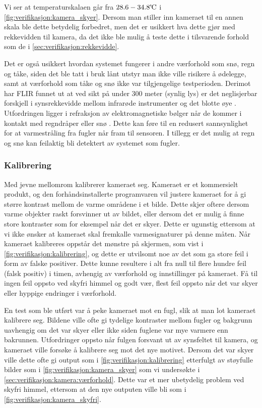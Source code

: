 Vi ser at temperaturskalaen går fra $28.6-34.8 \celsius$ i \autoref{fig:verifikasjon:kamera_skyer}. 
Dersom man stiller inn kameraet til en annen skala ble dette betydelig forbedret, men det er usikkert hva dette gjør med rekkevidden til kamera, da det ikke ble mulig å teste dette i tilsvarende forhold som de i \autoref{sec:verifikasjon:rekkevidde}.



Det er også usikkert hvordan systemet fungerer i andre værforhold som snø, regn og tåke, siden det ble tatt i bruk lånt utstyr man ikke ville risikere å ødelegge, samt at værforhold som tåke og snø ikke var tilgjengelige testperioden.
Derimot har FLIR funnet ut at ved sikt på under 300 meter (synlig lys) er det neglisjerbar forskjell i synsrekkevidde mellom infrarøde instrumenter og det blotte øye \cite{tåke}.
Utfordringen ligger i refraksjon av elektromagnetiske bølger når de kommer i kontakt med regndråper eller snø \cite{refraksjon}.
Dette kan føre til en redusert sannsynlighet for at varmestråling fra fugler når fram til sensoren. I tillegg er det mulig at regn og snø kan feilaktig bli detektert av systemet som fugler.

\subsubsection{Kalibrering}\label{sec:verifikasjon:kamera:kalibrering}

Med jevne mellomrom kalibrerer kameraet seg. 
Kameraet er et kommersielt produkt, og den forhåndsinstallerte programvaren vil justere kameraet for å gi større kontrast mellom de varme områdene i et bilde. 
Dette skjer oftere dersom varme objekter raskt forsvinner ut av bildet, eller dersom det er mulig å finne store kontraster som for eksempel når det er skyer. 
Dette er ugunstig ettersom at vi ikke ønsker at kameraet skal fremkalle varmesignaturer på denne måten. 
Når kameraet kalibreres oppstår det mønstre på skjermen, som vist i \autoref{fig:verifikasjon:kalibrering}, og dette er utvilsomt noe av det som ga store feil i form av falske positiver.
Dette kunne resultere i alt fra null til flere hundre feil (falsk positiv) i timen, avhengig av værforhold og innstillinger på kameraet. 
Få til ingen feil oppsto ved skyfri himmel og godt vær, flest feil oppsto når det var skyer eller hyppige endringer i værforhold.


En test som ble utført var å peke kameraet mot en fugl, slik at man lot kameraet kalibrere seg. 
Bildene ville ofte gi tydelige kontraster mellom fugler og bakgrunn uavhengig om det var skyer eller ikke siden fuglene var mye varmere enn bakrunnen. 
Utfordringer oppsto når fulgen forsvant ut av synsfeltet til kamera, og kameraet ville forsøke å kalibrere seg mot det nye motivet. 
Dersom det var skyer ville dette ofte gi output som i \autoref{fig:verifikasjon:kalibrering} etterfulgt av støyfulle bilder som i \autoref{fig:verifikasjon:kamera_skyer} som vi undersøkte i \autoref{sec:verifikasjon:kamera:værforhold}. 
Dette var et mer ubetydelig problem ved skyfri himmel, ettersom at den nye outputen ville bli som i \autoref{fig:verifikasjon:kamera_skyfri}.

